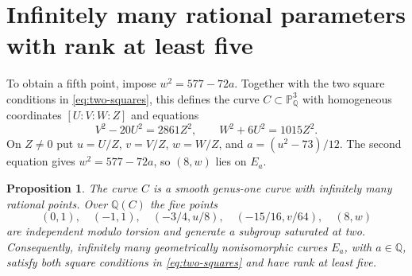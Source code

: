 \documentclass[draft]{publmathdeb}
\newtheorem{proposition}[theorem]{Proposition}
\theoremstyle{remark}
\numberwithin{equation}{section}
\newcommand{\Q}{\mathbb Q}
\begin{document}

\section{Infinitely many rational parameters with rank at least five}

To obtain a fifth point, impose $w^2=577-72a$. Together with the two square conditions in \eqref{eq:two-squares}, this defines the curve $C\subset\mathbb P^3_{\Q}$ with homogeneous coordinates $[U:V:W:Z]$ and equations
\begin{equation}\label{eq:rank-five-base}
  V^2-20U^2=2861Z^2,\qquad W^2+6U^2=1015Z^2.
\end{equation}
On $Z\ne0$ put $u=U/Z$, $v=V/Z$, $w=W/Z$, and $a=(u^2-73)/12$. The second equation gives $w^2=577-72a$, so $(8,w)$ lies on $E_a$.

\begin{proposition}\label{prop:rank-five-rational}
  The curve $C$ is a smooth genus-one curve with infinitely many rational points. Over $\Q(C)$ the five points
  \[
    (0,1),\quad(-1,1),\quad(-3/4,u/8),\quad(-15/16,v/64),\quad(8,w)
  \]
  are independent modulo torsion and generate a subgroup saturated at two. Consequently, infinitely many geometrically nonisomorphic curves $E_a$, with $a\in\Q$, satisfy both square conditions in \eqref{eq:two-squares} and have rank at least five.
\end{proposition}
\end{document}
